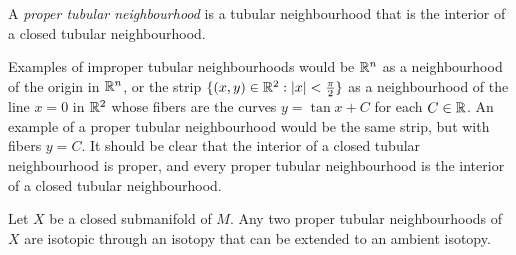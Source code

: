 \begin{defn}
	A \emph{proper tubular neighbourhood} is a tubular neighbourhood that is the interior of a closed tubular neighbourhood.
\end{defn}

Examples of improper tubular neighbourhoods would be $\mathbb{R}^n$ as a neighbourhood of the origin in $\mathbb{R}^n$, or the strip $\{ (x,y)\in \mathbb{R}^2 : |x|< \frac{\pi}{2}\}$ as a neighbourhood of the line $x=0$ in $\mathbb{R}^2$ whose fibers are the curves $y=\tan x + C$ for each $C\in\mathbb{R}$.
An example of a proper tubular neighbourhood would be the same strip, but with fibers $y=C$.
It should be clear that the interior of a closed tubular neighbourhood is proper, and every proper tubular neighbourhood is the interior of a closed tubular neighbourhood.

\begin{theorem}
	Let $X$ be a closed submanifold of $M$.
	Any two proper tubular neighbourhoods of $X$ are isotopic through an isotopy that can be extended to an ambient isotopy.
\end{theorem}
